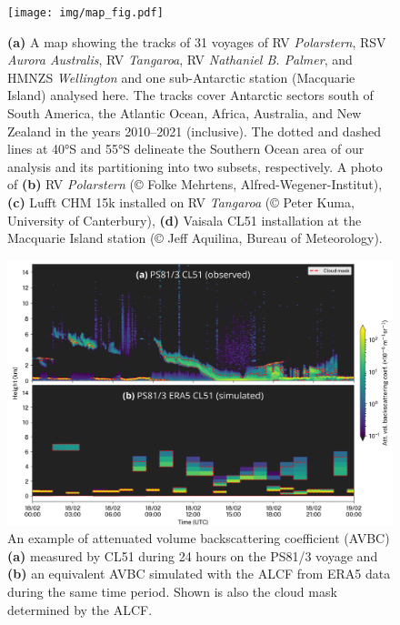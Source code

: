 \documentclass[12pt,a4paper]{article}
\begin{document}
\begin{figure}
\centering
\texttt{[image: img/map\_fig.pdf]}
\caption{
\textbf{(a)} A map showing the tracks of 31 voyages of RV \emph{Polarstern},
RSV \emph{Aurora Australis}, RV \emph{Tangaroa}, RV \emph{Nathaniel B. Palmer},
and HMNZS \emph{Wellington} and one sub-Antarctic station (Macquarie Island)
analysed here. The tracks cover Antarctic sectors south of South America, the
Atlantic Ocean, Africa, Australia, and New Zealand in the years 2010--2021
(inclusive).  The dotted and dashed lines at 40°S and 55°S delineate the
Southern Ocean area of our analysis and its partitioning into two subsets,
respectively.  A photo of \textbf{(b)} RV \emph{Polarstern} (© Folke Mehrtens,
Alfred-Wegener-Institut), \textbf{(c)} Lufft CHM 15k installed on RV
\emph{Tangaroa} (© Peter Kuma, University of Canterbury), \textbf{(d)} Vaisala
CL51 installation at the Macquarie Island station (© Jeﬀ Aquilina, Bureau of
Meteorology).
}
\label{fig:map}
\end{figure}

\begin{figure}
\centering
\includegraphics[width=\textwidth]{img/example.png}
\caption{
An example of attenuated volume backscattering coefficient (AVBC) \textbf{(a)}
measured by CL51 during 24 hours on the PS81/3 voyage and \textbf{(b)} an
equivalent AVBC simulated with the ALCF from ERA5 data during the same time
period. Shown is also the cloud mask determined by the ALCF.
}
\label{fig:example}
\end{figure}
\end{document}
